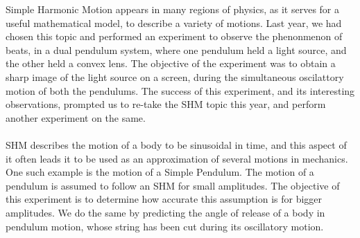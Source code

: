 Simple Harmonic Motion appears in many regions of physics, as it serves for a useful mathematical model, to describe a variety of motions. Last year, we had chosen this topic and performed an experiment to observe the phenonmenon of beats, in a dual pendulum system, where one pendulum held a light source, and the other held a convex lens. The objective of the experiment was to obtain a sharp image of the light source on a screen, during the simultaneous oscilattory motion of both the pendulums. The success of this experiment, and its interesting observations, prompted us to re-take the SHM topic this year, and perform another experiment on the same.\\ \\
SHM describes the motion of a body to be sinusoidal in time, and this aspect of it often leads it to be used as an approximation of several motions in mechanics. One such example is the motion of a Simple Pendulum. The motion of a pendulum is assumed to follow an SHM for small amplitudes. The objective of this experiment is to determine how accurate this assumption is for bigger amplitudes. We do the same by predicting the angle of release of a body in pendulum motion, whose string has been cut during its oscillatory motion.


